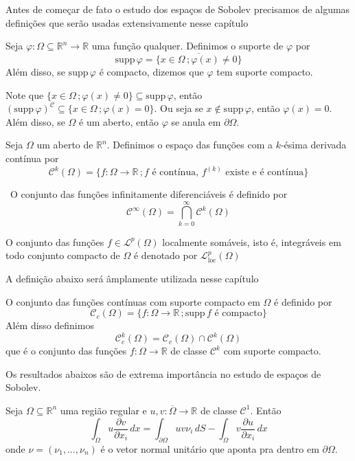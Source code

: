 \documentclass[a4paper, 11pt]{book}
\theoremstyle{definition}
\newcommand{\obs}{\noindent{\textbf{\textcolor{black}{\sffamily Observação:}}}~}
\newcommand{\bR}{\mathbb{R}}
\newcommand{\cC}{\mathcal{C}}
\newcommand{\cL}{\mathcal{L}}
\newcommand{\supp}{\mathrm{supp}\,}
\begin{document}
Antes de começar de fato o estudo dos espaços de Sobolev precisamos de algumas definições que serão usadas extensivamente nesse capítulo

\begin{dbox} \label{def:suporte}
    Seja $\varphi : \Omega \subseteq \bR ^n \to \bR$ uma função qualquer. Definimos o suporte de $\varphi$ por
    \[
        \supp \varphi = \overline{\{x \in \Omega \,; \varphi(x) \neq 0\}}
    \]
    Além disso, se $\supp\varphi$ é compacto, dizemos que $\varphi$ tem suporte compacto.
\end{dbox}

Note que $\{x \in \Omega \,; \varphi(x) \neq 0\} \subseteq \supp \varphi$, então $(\supp \varphi)^\cC \subseteq \{x \in \Omega \,; \varphi(x) = 0\}$. Ou seja se $x \not\in \supp \varphi$, então $\varphi(x) = 0$.
Além disso, se $\Omega$ é um aberto, então $\varphi$ se anula em $\partial\Omega$.

\begin{dbox}
    Seja $\Omega$ um aberto de $\bR^n$. Definimos o espaço das funções com a $k$-ésima derivada contínua por
    \[
        \cC^k(\Omega) = \{f : \Omega \to \bR \,; f \text{ é contínua, } f^{(k)} \text{ existe e é contínua}\}
    \]
\end{dbox}

\obs O conjunto das funções infinitamente diferenciáveis é definido por
\[
    \cC^\infty(\Omega) = \bigcap_{k=0}^\infty \cC^k(\Omega)
\]

\begin{dbox}
    O conjunto das funções $f \in \cL^p(\Omega)$ localmente somáveis, isto é, integráveis em todo conjunto compacto de $\Omega$ é denotado por $\cL^p_{\mathrm{loc}}(\Omega)$ 
\end{dbox}

A definição abaixo será âmplamente utilizada nesse capítulo

\begin{dbox}
    O conjunto das funções contínuas com suporte compacto em $\Omega$ é definido por
    \[
        \cC_c(\Omega) = \{f : \Omega \to \bR \,; \supp f \text{ é compacto}\}
    \]
    Além disso definimos
    \[
        \cC^k_c(\Omega) = \cC_c(\Omega) \cap \cC^k(\Omega)
    \]
    que é o conjunto das funções $f : \Omega \to \bR$ de classe $\cC^k$ com suporte compacto.
\end{dbox}

Os resultados abaixos são de extrema importância no estudo de espaços de Sobolev.

\begin{tbox}[Integração por partes em $\bR ^n$] \label{thm:integracao-por-partes}
    Seja $\Omega \subseteq \bR^n$ uma região regular e $u, v : \overline\Omega \to \bR$ de classe $\cC^1$. 
    Então
    \[
        \int_\Omega u \dfrac{\partial v}{\partial x_i} \,dx = \int_{\partial\Omega} uv \nu_i \, dS- \int_\Omega v \dfrac{\partial u}{\partial x_i} \,dx
    \]
    onde $\nu = (\nu_1,\dots,\nu_n)$ é o vetor normal unitário que aponta pra dentro em $\partial\Omega$.   
\end{tbox}
\begin{prf}
    \Cite{evans-pde}
\end{prf}
\end{document}
